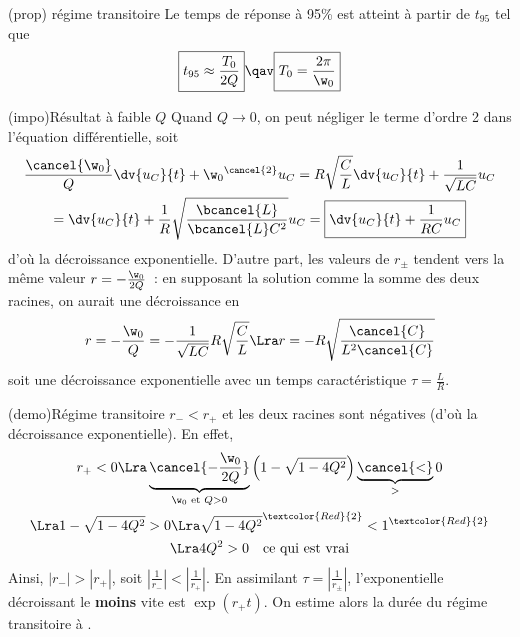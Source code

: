 \documentclass[../../main/main.tex]{subfiles}
\begin{document}
\begin{tcbraster}[raster columns=2, raster equal height=rows]
	\begin{tcolorbox}[blankest, raster multicolumn=1, space to=\myspace]
		\begin{tcbraster}[raster columns=1]
			\begin{tcb}[label=prop:transiaper, add to natural height=\myspace](prop)
				{régime transitoire}
				Le temps de réponse à 95\% est atteint à partir de $t_{95}$ tel que
				\begin{equation*}
					\boxed{t_{95} \approx \frac{T_0}{2Q}} \qav \boxed{T_0 =
						\frac{2\pi}{\w_0}}
				\end{equation*}
			\end{tcb}
			\begin{tcb}[label=impo:aperpetitQ](impo){Résultat à faible $Q$}
				Quand $Q \longrightarrow 0$, on peut négliger le terme d'ordre 2
				dans l'équation différentielle, soit
				\begin{gather*}
					\frac{\cancel{\w_0}}{Q}\dv{u_C}{t} +
					\w_0{}^{\cancel{2}}u_C = R \sqrt{\frac{C}{L}} \dv{u_C}{t} +
					\frac{1}{\sqrt{LC}}u_C \\
					=
					\dv{u_C}{t} + \frac{1}{R}
					\sqrt{\frac{\bcancel{L}}{\bcancel{L}C^2}} u_C
					=
					\boxed{ \dv{u_C}{t} +
						\frac{1}{RC} u_C}
				\end{gather*}
				d'où la décroissance exponentielle. D'autre part,
				les valeurs de $r_\pm$ tendent vers la
				même valeur $r = - \frac{\w_0}{2Q}$~: en supposant la solution
				comme la somme des deux racines, on aurait une décroissance en
				\begin{gather*}
					r = -\frac{\w_0}{Q} = - \frac{1}{\sqrt{LC}}R
					\sqrt{\frac{C}{L}}
					\Lra
					r = -R \sqrt{\frac{\cancel{C}}{L^2\cancel{C}}}
				\end{gather*}
				soit une décroissance exponentielle avec un temps
				caractéristique $\tau = \frac{L}{R}$.
			\end{tcb}
		\end{tcbraster}
	\end{tcolorbox}
	\begin{tcb}[label=demo:transiaper](demo){Régime transitoire}
		$r_- < r_+$ et les deux racines sont négatives (d'où la décroissance
		exponentielle). En effet,
		\begin{gather*}
			r_+ < 0
			\Lra
			\underbrace{\cancel{-\frac{\w_0}{2Q}}}_{\w_0 \text{ et } Q > 0}
			\left( 1 - \sqrt{1-4Q^2}
			\right) \underbrace{\cancel{<}}_{>} 0\\
			\Lra
			1 - \sqrt{1 - 4Q^2} > 0
			\Lra
			\sqrt{1-4Q^2}^{\textcolor{Red}{2}} < 1^{\textcolor{Red}{2}}\\
			\Lra
			4Q^2 > 0 \quad \text{ce qui est vrai}
		\end{gather*}
		Ainsi, $\left| r_- \right| > \left| r_+ \right|$, soit
		$ \left| \frac{1}{r_-} \right| < \left| \frac{1}{r_+} \right|$. En
		assimilant $\tau = \left| \frac{1}{r_\pm} \right|$, l'exponentielle
		décroissant le \textbf{moins} vite est $\exp(r_+t)$. On estime alors la
		durée du régime transitoire à .\bigbreak


\end{tcb}
\end{tcbraster}
\end{document}

